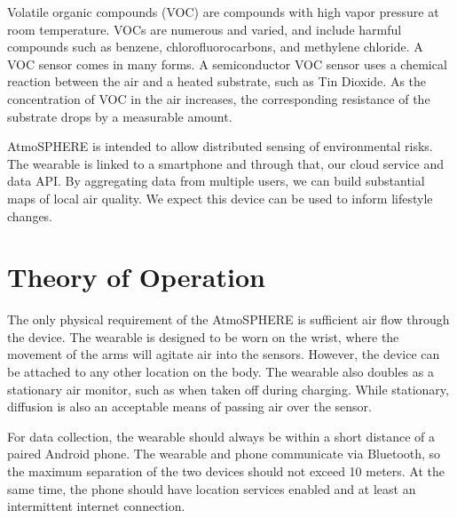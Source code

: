 \documentclass{sigchi}
\begin{document}
Volatile organic compounds (VOC) are compounds with high vapor pressure at room temperature.
VOCs are numerous and varied, and include harmful compounds such as benzene, chlorofluorocarbons, and methylene chloride.
A VOC sensor comes in many forms.
A semiconductor VOC sensor uses a chemical reaction between the air and a heated substrate, such as Tin Dioxide\cite{VOCSensor:Datasheet}.
As the concentration of VOC in the air increases, the corresponding resistance of the substrate drops by a measurable amount.

AtmoSPHERE is intended to allow distributed sensing of environmental risks.
The wearable is linked to a smartphone and through that, our cloud service and data API.
By aggregating data from multiple users, we can build substantial maps of local air quality.
We expect this device can be used to inform lifestyle changes.

\section{Theory of Operation}
The only physical requirement of the AtmoSPHERE is sufficient air flow through the device.
The wearable is designed to be worn on the wrist, where the movement of the arms will agitate air into the sensors.
However, the device can be attached to any other location on the body.
The wearable also doubles as a stationary air monitor, such as when taken off during charging.
While stationary, diffusion is also an acceptable means of passing air over the sensor.

For data collection, the wearable should always be within a short distance of a paired Android phone.
The wearable and phone communicate via Bluetooth, so the maximum separation of the two devices should not exceed 10 meters.
At the same time, the phone should have location services enabled and at least an intermittent internet connection.
\end{document}
